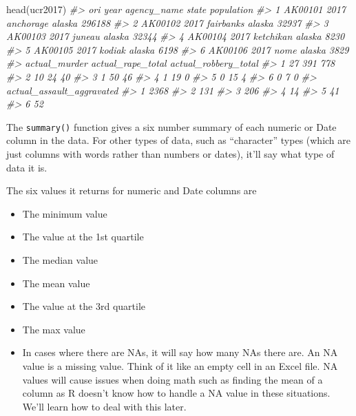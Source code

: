 \documentclass[
  12pt,
  openany]{book}
\newenvironment{Shaded}{\begin{snugshade}}{\end{snugshade}}
\newcommand{\CommentTok}[1]{\textcolor[rgb]{0.37,0.37,0.37}{\textit{#1}}}
\newcommand{\FunctionTok}[1]{\textcolor[rgb]{0,0,0}{#1}}
\newcommand{\NormalTok}[1]{#1}
\providecommand{\tightlist}{%
  \setlength{\itemsep}{0pt}\setlength{\parskip}{0pt}}
\begin{document}
\begin{Shaded}
\begin{Highlighting}[]
\FunctionTok{head}\NormalTok{(ucr2017)}
\CommentTok{\#\textgreater{}       ori year agency\_name  state population}
\CommentTok{\#\textgreater{} 1 AK00101 2017   anchorage alaska     296188}
\CommentTok{\#\textgreater{} 2 AK00102 2017   fairbanks alaska      32937}
\CommentTok{\#\textgreater{} 3 AK00103 2017      juneau alaska      32344}
\CommentTok{\#\textgreater{} 4 AK00104 2017   ketchikan alaska       8230}
\CommentTok{\#\textgreater{} 5 AK00105 2017      kodiak alaska       6198}
\CommentTok{\#\textgreater{} 6 AK00106 2017        nome alaska       3829}
\CommentTok{\#\textgreater{}   actual\_murder actual\_rape\_total actual\_robbery\_total}
\CommentTok{\#\textgreater{} 1            27               391                  778}
\CommentTok{\#\textgreater{} 2            10                24                   40}
\CommentTok{\#\textgreater{} 3             1                50                   46}
\CommentTok{\#\textgreater{} 4             1                19                    0}
\CommentTok{\#\textgreater{} 5             0                15                    4}
\CommentTok{\#\textgreater{} 6             0                 7                    0}
\CommentTok{\#\textgreater{}   actual\_assault\_aggravated}
\CommentTok{\#\textgreater{} 1                      2368}
\CommentTok{\#\textgreater{} 2                       131}
\CommentTok{\#\textgreater{} 3                       206}
\CommentTok{\#\textgreater{} 4                        14}
\CommentTok{\#\textgreater{} 5                        41}
\CommentTok{\#\textgreater{} 6                        52}
\end{Highlighting}
\end{Shaded}

The \texttt{summary()} function gives a six number summary of each numeric or Date column in the data. For other types of data, such as ``character'' types (which are just columns with words rather than numbers or dates), it'll say what type of data it is.

The six values it returns for numeric and Date columns are

\begin{itemize}
\tightlist
\item
  The minimum value
\item
  The value at the 1st quartile
\item
  The median value
\item
  The mean value
\item
  The value at the 3rd quartile
\item
  The max value
\item
  In cases where there are NAs, it will say how many NAs there are. An NA value is a missing value. Think of it like an empty cell in an Excel file. NA values will cause issues when doing math such as finding the mean of a column as R doesn't know how to handle a NA value in these situations. We'll learn how to deal with this later.
\end{itemize}
\end{document}
